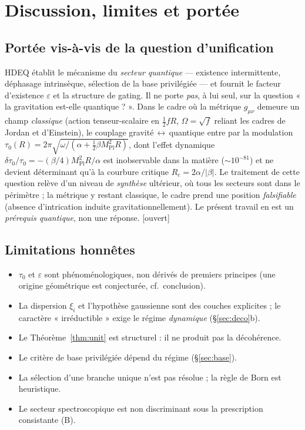 \documentclass[11pt,a4paper]{article}
\newcommand{\statut}[1]{{\footnotesize\textsf{[#1]}}}
\theoremstyle{plain}
\theoremstyle{definition}
\theoremstyle{remark}
\begin{document}
\section{Discussion, limites et port\'ee}
\subsection{Port\'ee vis-\`a-vis de la question d'unification}
HDEQ \'etablit le m\'ecanisme du \emph{secteur quantique} --- existence
intermittente, d\'ephasage intrins\`eque, s\'election de la base privil\'egi\'ee --- et
fournit le facteur d'existence $\varepsilon$ et la structure de gating. Il ne
porte \emph{pas}, \`a lui seul, sur la question « la gravitation est-elle
quantique ? ». Dans le cadre o\`u la m\'etrique $g_{\mu\nu}$ demeure un champ
\emph{classique} (action tenseur-scalaire en $\tfrac12 fR$, $\Omega=\sqrt f$
reliant les cadres de Jordan et d'Einstein), le couplage gravit\'e$\,\leftrightarrow\,$quantique
entre par la modulation $\tau_0(R)=2\pi\sqrt{\omega/(\alpha+\tfrac12\beta
M_{\mathrm{Pl}}^2 R)}$, dont l'effet dynamique
$\delta\tau_0/\tau_0=-(\beta/4)M_{\mathrm{Pl}}^2 R/\alpha$ est inobservable dans
la mati\`ere ($\sim10^{-81}$) et ne devient d\'eterminant qu'\`a la courbure critique
$R_c=2\alpha/|\beta|$. Le traitement de cette question rel\`eve d'un niveau de
\emph{synth\`ese} ult\'erieur, o\`u tous les secteurs sont dans le p\'erim\`etre ; la
m\'etrique y restant classique, le cadre prend une position \emph{falsifiable} (absence
d'intrication induite gravitationnellement). Le pr\'esent travail en est un
\emph{pr\'erequis quantique}, non une r\'eponse. \statut{ouvert}

\subsection{Limitations honn\^etes}
\begin{itemize}
\item $\tau_0$ et $\varepsilon$ sont ph\'enom\'enologiques, non d\'eriv\'es de premiers principes (une origine g\'eom\'etrique est conjectur\'ee, cf.\ conclusion).
\item La dispersion $\xi_i$ et l'hypoth\`ese gaussienne sont des couches explicites ; le caract\`ere « irr\'eductible » exige le r\'egime \emph{dynamique} (\S\ref{sec:deco}b).
\item Le Th\'eor\`eme~\ref{thm:unit} est structurel : il ne produit pas la d\'ecoh\'erence.
\item Le crit\`ere de base privil\'egi\'ee d\'epend du r\'egime (\S\ref{sec:base}).
\item La s\'election d'une branche unique n'est pas r\'esolue ; la r\`egle de Born est heuristique.
\item Le secteur spectroscopique est non discriminant sous la prescription consistante (B).
\end{itemize}
\end{document}
